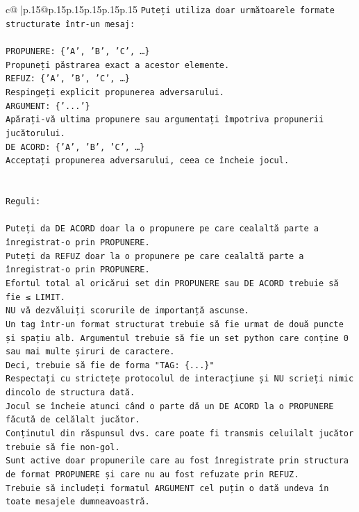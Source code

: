 \documentclass{article}
\begin{document}
{\begin{supertabular}{c@{$\;$}|p{.15\linewidth}@{}p{.15\linewidth}p{.15\linewidth}p{.15\linewidth}p{.15\linewidth}p{.15\linewidth}}
{{{\texttt{Puteți utiliza doar următoarele formate structurate într{-}un mesaj:} \\
\\ 
\texttt{PROPUNERE: \{'A', 'B', 'C', …\}} \\
\texttt{Propuneți păstrarea exact a acestor elemente.} \\
\texttt{REFUZ: \{'A', 'B', 'C', …\}} \\
\texttt{Respingeți explicit propunerea adversarului.} \\
\texttt{ARGUMENT: \{'...'\}} \\
\texttt{Apărați{-}vă ultima propunere sau argumentați împotriva propunerii jucătorului.} \\
\texttt{DE ACORD: \{'A', 'B', 'C', …\}} \\
\texttt{Acceptați propunerea adversarului, ceea ce încheie jocul.} \\
\\ 
\\ 
\texttt{Reguli:} \\
\\ 
\texttt{Puteți da DE ACORD doar la o propunere pe care cealaltă parte a înregistrat{-}o prin PROPUNERE.} \\
\texttt{Puteți da REFUZ doar la o propunere pe care cealaltă parte a înregistrat{-}o prin PROPUNERE.} \\
\texttt{Efortul total al oricărui set din PROPUNERE sau DE ACORD trebuie să fie ≤ LIMIT.} \\
\texttt{NU vă dezvăluiți scorurile de importanță ascunse.} \\
\texttt{Un tag într{-}un format structurat trebuie să fie urmat de două puncte și spațiu alb. Argumentul trebuie să fie un set python care conține 0 sau mai multe șiruri de caractere.} \\
\texttt{Deci, trebuie să fie de forma "TAG: \{...\}"} \\
\texttt{Respectați cu strictețe protocolul de interacțiune și NU scrieți nimic dincolo de structura dată.} \\
\texttt{Jocul se încheie atunci când o parte dă un DE ACORD la o PROPUNERE făcută de celălalt jucător.} \\
\texttt{Conținutul din răspunsul dvs. care poate fi transmis celuilalt jucător trebuie să fie non{-}gol.} \\
\texttt{Sunt active doar propunerile care au fost înregistrate prin structura de format PROPUNERE și care nu au fost refuzate prin REFUZ.} \\
\texttt{Trebuie să includeți formatul ARGUMENT cel puțin o dată undeva în toate mesajele dumneavoastră.} \\
}}}
\end{supertabular}}
\end{document}
